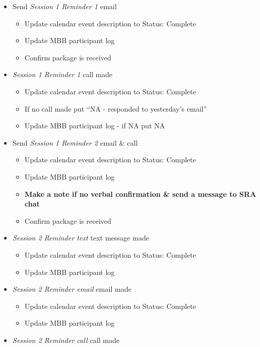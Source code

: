 \documentclass[]{book}
\providecommand{\tightlist}{%
  \setlength{\itemsep}{0pt}\setlength{\parskip}{0pt}}
\begin{document}
\begin{itemize}
\tightlist
\item
  Send \emph{Session 1 Reminder 1} email

  \begin{itemize}
  \tightlist
  \item
    Update calendar event description to Status: Complete
  \item
    Update MBB participant log\\
  \item
    Confirm package is received
  \end{itemize}
\item
  \emph{Session 1 Reminder 1} call made

  \begin{itemize}
  \tightlist
  \item
    Update calendar event description to Status: Complete\\
  \item
    If no call made put ``NA - responded to yesterday's email''
  \item
    Update MBB participant log - if NA put NA\\
  \end{itemize}
\item
  Send \emph{Session 1 Reminder 2} email \& call

  \begin{itemize}
  \tightlist
  \item
    Update calendar event description to Status: Complete
  \item
    Update MBB participant log
  \item
    \textbf{Make a note if no verbal confirmation \& send a message to SRA chat}
  \item
    Confirm package is received
  \end{itemize}
\item
  \emph{Session 2 Reminder text} text message made

  \begin{itemize}
  \tightlist
  \item
    Update calendar event description to Status: Complete
  \item
    Update MBB participant log
  \end{itemize}
\item
  \emph{Session 2 Reminder email} email made

  \begin{itemize}
  \tightlist
  \item
    Update calendar event description to Status: Complete
  \item
    Update MBB participant log
  \end{itemize}
\item
  \emph{Session 2 Reminder call} call made


\end{itemize}
\end{document}
